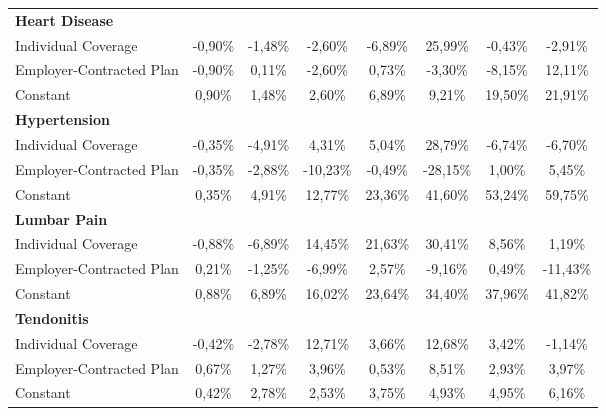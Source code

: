 \documentclass{article}
\begin{document}
\begin{table*}
{\begin{tabular}{l*{7}{c}}
\midrule
\textbf{Heart Disease}  & & & & & & & \\

Individual Coverage      & -0,90\%\sym{***}& -1,48\%\sym{***}& -2,60\%\sym{***}& -6,89\%\sym{***}& 25,99\%         & -0,43\%         & -2,91\%         \\
Employer-Contracted Plan & -0,90\%\sym{***}&  0,11\%         & -2,60\%\sym{***}&  0,73\%         & -3,30\%         & -8,15\%         & 12,11\%         \\
Constant                 &  0,90\%\sym{***}&  1,48\%\sym{***}&  2,60\%\sym{***}&  6,89\%\sym{***}&  9,21\%\sym{***}& 19,50\%\sym{***}& 21,91\%\sym{***}\\

\midrule
\textbf{Hypertension}  & & & & & & & \\

Individual Coverage      & -0,35\%\sym{**} & -4,91\%\sym{***}&  4,31\%         &  5,04\%         & 28,79\%         & -6,74\%         & -6,70\%         \\
Employer-Contracted Plan & -0,35\%\sym{**} & -2,88\%         &-10,23\%\sym{***}& -0,49\%         &-28,15\%\sym{**} &  1,00\%         &  5,45\%         \\
Constant                 &  0,35\%\sym{**} &  4,91\%\sym{***}& 12,77\%\sym{***}& 23,36\%\sym{***}& 41,60\%\sym{***}& 53,24\%\sym{***}& 59,75\%\sym{***}\\

\midrule
\textbf{Lumbar Pain}  & & & & & & & \\

Individual Coverage      & -0,88\%\sym{***}& -6,89\%\sym{***}& 14,45\%         & 21,63\%         & \cellcolor[gray]{0.9} 30,41\%\sym{*}  &  8,56\%         &  1,19\%         \\
Employer-Contracted Plan &  0,21\%         & -1,25\%         & -6,99\%         &  2,57\%         & -9,16\%         &  0,49\%         &-11,43\%         \\
Constant                 &  0,88\%\sym{***}&  6,89\%\sym{***}& 16,02\%\sym{***}& 23,64\%\sym{***}& 34,40\%\sym{***}& 37,96\%\sym{***}& 41,82\%\sym{***}\\

\midrule
\textbf{Tendonitis}  & & & & & & & \\

Individual Coverage      & -0,42\%\sym{*}  & -2,78\%\sym{***}& 12,71\%         &  3,66\%         & 12,68\%         &  3,42\%         & -1,14\%         \\
Employer-Contracted Plan &  0,67\%         &  1,27\%         &  3,96\%         &  0,53\%         &  8,51\%         &  2,93\%         &  3,97\%         \\
Constant                 &  0,42\%\sym{*}  &  2,78\%\sym{***}&  2,53\%\sym{***}&  3,75\%\sym{***}&  4,93\%\sym{***}&  4,95\%\sym{***}&  6,16\%\sym{***}\\


\end{tabular}}
\end{table*}
\end{document}
